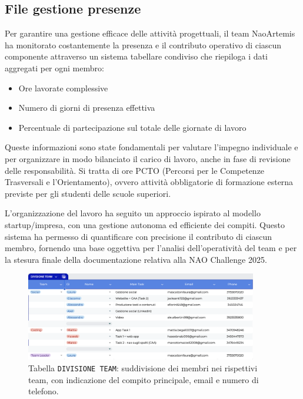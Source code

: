 \documentclass{optica-article}
\begin{document}
\begin{abstract*}
\subsection{File gestione presenze}
Per garantire una gestione efficace delle attività progettuali, il team NaoArtemis ha monitorato costantemente la presenza e il contributo operativo di ciascun componente attraverso un sistema tabellare condiviso che riepiloga i dati aggregati per ogni membro:
\begin{itemize}
  \item Ore lavorate complessive
  \item Numero di giorni di presenza effettiva
  \item Percentuale di partecipazione sul totale delle giornate di lavoro 
\end{itemize}

Queste informazioni sono state fondamentali per valutare l’impegno individuale e per organizzare in modo bilanciato il carico di lavoro, anche in fase di revisione delle responsabilità. Si tratta di ore PCTO (Percorsi per le Competenze Trasversali e l’Orientamento), ovvero attività obbligatorie di formazione esterna previste per gli studenti delle scuole superiori.

L’organizzazione del lavoro ha seguito un approccio ispirato al modello startup/impresa, con una gestione autonoma ed efficiente dei compiti. Questo sistema ha permesso di quantificare con precisione il contributo di ciascun membro, fornendo una base oggettiva per l’analisi dell’operatività del team e per la stesura finale della documentazione relativa alla NAO Challenge 2025.


\begin{figure}[H]
    \centering
    \includegraphics[width=0.9\textwidth]{figures/divisione_team.png}
    \caption{Tabella \texttt{DIVISIONE TEAM}: suddivisione dei membri nei rispettivi team, con indicazione del compito principale, email e numero di telefono.}
    \label{fig:divisione_team}
\end{figure}


\end{abstract*}
\end{document}
